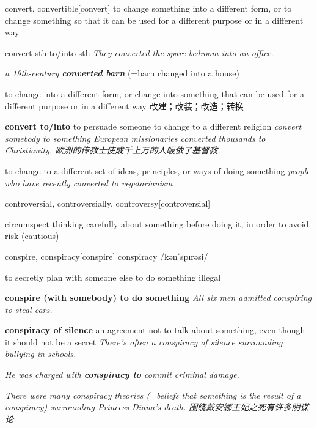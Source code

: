 \begin{DefWord}{convert, convertible}[convert]
    to change something into a different form, or to change something so that it can be used for a different purpose or in a different way

    convert sth to/into sth
    \textit{They converted the spare bedroom into an office.}

    \textit{a 19th-century \textbf{converted barn}} (=barn changed into a house)

    to change into a different form, or change into something that can be used for a different purpose or in a different way 改建；改装；改造；转换

    \textbf{convert to/into}
    to persuade someone to change to a different religion
    \textit{convert somebody to something
    European missionaries converted thousands to Christianity. 欧洲的传教士使成千上万的人皈依了基督教. }

    to change to a different set of ideas, principles, or ways of doing something
    \textit{people who have recently converted to vegetarianism}
\end{DefWord}

\begin{DefWord}{controversial, controversially, controversy}[controversial]
\end{DefWord}

\begin{DefWord}{circumspect}
    thinking carefully about something before doing it, in order to avoid risk (cautious)
\end{DefWord}

\begin{DefWord}{conspire, conspiracy}[conspire]
    conspiracy /kənˈspɪrəsi/

    to secretly plan with someone else to do something illegal

    \textbf{conspire (with somebody) to do something}
    \textit{All six men admitted conspiring to steal cars.}

    \textbf{conspiracy of silence} an agreement not to talk about something, even though it should not be a secret
    \textit{There's often a conspiracy of silence surrounding bullying in schools.}

    \textit{He was charged with \textbf{conspiracy to} commit criminal damage.}

    \textit{There were many conspiracy theories (=beliefs that something is the result of a conspiracy) surrounding Princess Diana's death. 围绕戴安娜王妃之死有许多阴谋论. }
\end{DefWord}